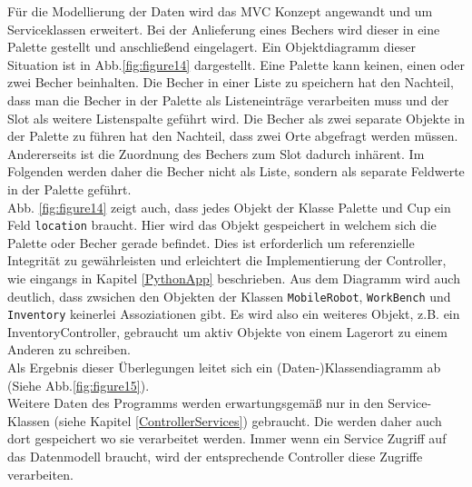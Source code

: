 Für die Modellierung der Daten wird das MVC Konzept angewandt und um Serviceklassen erweitert.
Bei der Anlieferung eines Bechers wird dieser in eine Palette gestellt und anschließend eingelagert.
Ein Objektdiagramm dieser Situation ist in Abb.\ref{fig:figure14} dargestellt.
Eine Palette kann keinen, einen oder zwei Becher beinhalten.
Die Becher in einer Liste zu speichern hat den Nachteil, dass man die Becher in der Palette als Listeneinträge verarbeiten muss
und der Slot als weitere Listenspalte geführt wird.
Die Becher als zwei separate Objekte in der Palette zu führen hat den Nachteil, dass zwei Orte abgefragt werden müssen.
Andererseits ist die Zuordnung des Bechers zum Slot dadurch inhärent.
Im Folgenden werden daher die Becher nicht als Liste, sondern als separate Feldwerte in der Palette geführt.\\
Abb. \ref{fig:figure14} zeigt auch, dass jedes Objekt der Klasse Palette und Cup ein Feld \verb|location| braucht.
Hier wird das Objekt gespeichert in welchem sich die Palette oder Becher gerade befindet.
Dies ist erforderlich um referenzielle Integrität zu gewährleisten und erleichtert die Implementierung der Controller,
wie eingangs in Kapitel \ref{PythonApp} beschrieben.
Aus dem Diagramm wird auch deutlich, dass zwsichen den Objekten der Klassen \verb|MobileRobot|, \verb|WorkBench| und
\verb|Inventory| keinerlei Assoziationen gibt.
Es wird also ein weiteres Objekt, z.B. ein InventoryController, gebraucht um aktiv Objekte von einem Lagerort zu einem Anderen
zu schreiben.\\
Als Ergebnis dieser Überlegungen leitet sich ein (Daten-)Klassendiagramm ab (Siehe Abb.\ref{fig:figure15}).\\
Weitere Daten des Programms werden erwartungsgemäß nur in den Service-Klassen (siehe Kapitel \ref{ControllerServices})
gebraucht.
Die werden daher auch dort gespeichert wo sie verarbeitet werden.
Immer wenn ein Service Zugriff auf das Datenmodell braucht, wird der entsprechende Controller diese Zugriffe verarbeiten.\\



